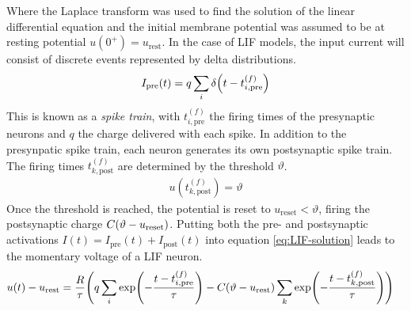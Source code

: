 Where the Laplace transform was used to find the solution of the linear differential equation and the initial membrane potential was assumed to be at resting potential $u(0^+)=u_\mathrm{rest}$. In the case of LIF models, the input current will consist of discrete events represented by delta distributions.
\begin{align}
    I_\mathrm{pre}(t) = q\sum_i \delta\qty(t-t_{i,\mathrm{pre}}^{(f)})
\end{align}
This is known as a \emph{spike train}, with $t_{i,\mathrm{pre}}^{(f)}$ the firing times of the presynaptic neurons and $q$ the charge delivered with each spike. In addition to the presynpatic spike train, each neuron generates its own postsynaptic spike train. The firing times $t_{k,\mathrm{post}}^{(f)}$ are determined by the threshold $\vartheta$.
\begin{align}
    u(t_{k,\mathrm{post}}^{(f)})=\vartheta
\end{align}
Once the threshold is reached, the potential is reset to $u_\mathrm{reset} < \vartheta$, firing the postsynaptic charge $C\qty(\vartheta-u_\mathrm{reset})$. Putting both the pre- and postsynaptic activations $I(t)=I_\mathrm{pre}(t)+I_\mathrm{post}(t)$ into equation \ref{eq:LIF-solution} leads to the momentary voltage of a LIF neuron.
\begin{align}
    u(t)-u_\mathrm{rest} &= \frac{R}{\tau}\qty(q \sum_i \exp(-\frac{t-t_{i,\mathrm{pre}}^{(f)}}{\tau})-C\qty(\vartheta-u_\mathrm{rest})\sum_k\exp(-\frac{t-t_{k,\mathrm{post}}^{(f)}}{\tau}))
\end{align}
